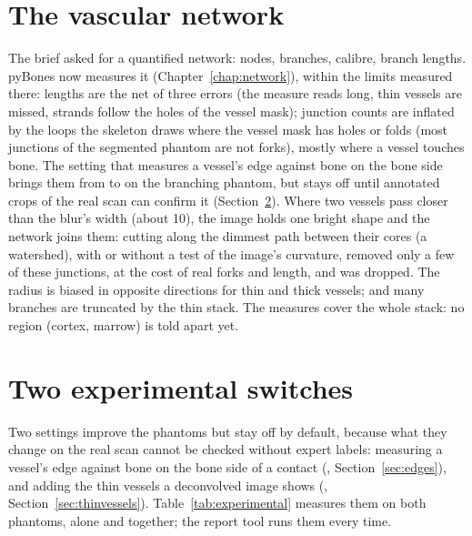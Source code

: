 \section{The vascular network}
\label{sec:netlimits}

The brief asked for a quantified network: nodes, branches, calibre, branch lengths. pyBones now
measures it (Chapter~\ref{chap:network}), within the limits measured there: lengths are the net of
three errors (the measure reads long, thin vessels are missed, strands follow the holes of the vessel
mask); junction counts are inflated by the loops the skeleton draws where the vessel mask has holes or
folds (most junctions of the segmented phantom are not forks), mostly where a vessel touches bone. The
setting that measures a vessel's edge against bone on the bone side brings them from
\pbValueExpDefaultSpurious{} to \pbValueExpBoneSideSpurious{} on the branching phantom, but stays off
until annotated crops of the real scan can confirm it (Section~\ref{sec:experimental}). Where two
vessels pass closer than the blur's width (about 10\um), the image holds one bright shape and the
network joins them: cutting along the dimmest path between their cores (a watershed), with or
without a test of the image's curvature, removed only a few of these junctions, at the cost of real
forks and length, and was dropped. The radius is biased in opposite directions for thin and
thick vessels; and many
branches are truncated by the thin stack. The measures cover the whole stack: no region (cortex,
marrow) is told apart yet.

\section{Two experimental switches}
\label{sec:experimental}

Two settings improve the phantoms but stay off by default, because what they change on the real scan
cannot be checked without expert labels: measuring a vessel's edge against bone on the bone side of a
contact (, Section~\ref{sec:edges}), and adding the thin vessels a
deconvolved image shows (, Section~\ref{sec:thinvessels}).
Table~\ref{tab:experimental} measures them on both phantoms, alone and together; the report tool runs
them every time.

\begin{table}[ht]
\centering
\small

\caption{The experimental switches on the standard phantom (vessel scores, recall of vessels thinner
  than 6\um) and on the branching phantom (forks found of those visible, other junctions, independent
  loops, error of the total length).}
\label{tab:experimental}
\end{table}

